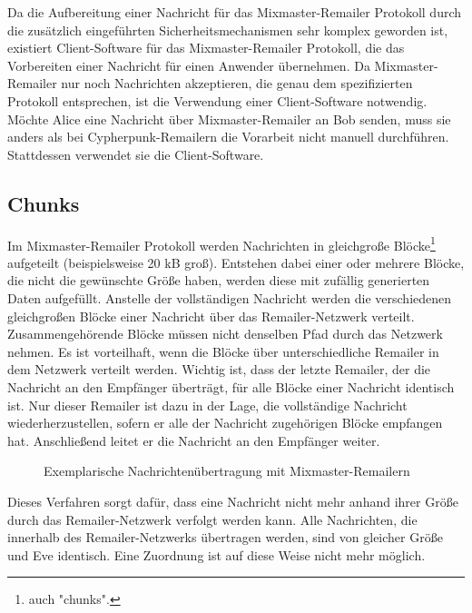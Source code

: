 Da die Aufbereitung einer Nachricht für das Mixmaster-Remailer Protokoll durch die zusätzlich eingeführten Sicherheitsmechanismen sehr komplex geworden ist, existiert Client-Software für das Mixmaster-Remailer Protokoll, die das Vorbereiten einer Nachricht für einen Anwender übernehmen. Da Mixmaster-Remailer nur noch Nachrichten akzeptieren, die genau dem spezifizierten Protokoll entsprechen, ist die Verwendung einer Client-Software notwendig. Möchte Alice eine Nachricht über Mixmaster-Remailer an Bob senden, muss sie anders als bei Cypherpunk-Remailern die Vorarbeit nicht manuell durchführen. Stattdessen verwendet sie die Client-Software.

\subsection{Chunks}
Im Mixmaster-Remailer Protokoll werden Nachrichten in gleichgroße Blöcke\footnote{auch "chunks".} aufgeteilt (beispielsweise 20 kB groß). Entstehen dabei einer oder mehrere Blöcke, die nicht die gewünschte Größe haben, werden diese mit zufällig generierten Daten aufgefüllt. Anstelle der vollständigen Nachricht werden die verschiedenen gleichgroßen Blöcke einer Nachricht über das Remailer-Netzwerk verteilt. Zusammengehörende Blöcke müssen nicht denselben Pfad durch das Netzwerk nehmen. Es ist vorteilhaft, wenn die Blöcke über unterschiedliche Remailer in dem Netzwerk verteilt werden. Wichtig ist, dass der letzte Remailer, der die Nachricht an den Empfänger überträgt, für alle Blöcke einer Nachricht identisch ist. Nur dieser Remailer ist dazu in der Lage, die vollständige Nachricht wiederherzustellen, sofern er alle der Nachricht zugehörigen Blöcke empfangen hat. Anschließend leitet er die Nachricht an den Empfänger weiter.

\begin{figure}
	\begin{center}
		\def\svgwidth{0.9 \linewidth}
		
		\caption{Exemplarische Nachrichtenübertragung mit Mixmaster-Remailern}
	\end{center}
\end{figure}

Dieses Verfahren sorgt dafür, dass eine Nachricht nicht mehr anhand ihrer Größe durch das Remailer-Netzwerk verfolgt werden kann. Alle Nachrichten, die innerhalb des Remailer-Netzwerks übertragen werden, sind von gleicher Größe und Eve identisch. Eine Zuordnung ist auf diese Weise nicht mehr möglich.

